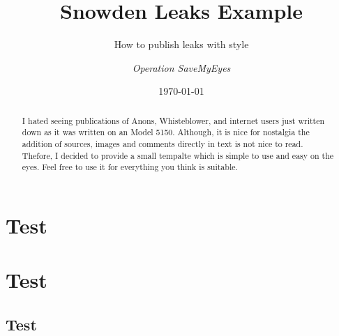 \documentclass[12pt,oneside,a4paper]{article}
\title{%
  Snowden Leaks Example
}%
\subtitle{%
  How to publish leaks with style
}%
\author{\small{\textit{Operation SaveMyEyes}}}
\date{\today}
\begin{document}
  
  \begin{abstract}
    I hated seeing publications of Anons, Whisteblower, and internet users just written down as it was written on an Model 5150. Although, it is nice for nostalgia the addition of sources, images and comments directly in text is not nice to read.\\
    \indent Thefore, I decided to provide a small tempalte which is simple to use and easy on the eyes. Feel free to use it for everything you think is suitable.
  \end{abstract}
  \blindmathtrue
  \section{Test}
  \Blindtext[5]
  \section{Test}
  \Blindtext[25]
  \subsection{Test}
  \blindtext[15]
\end{document}
